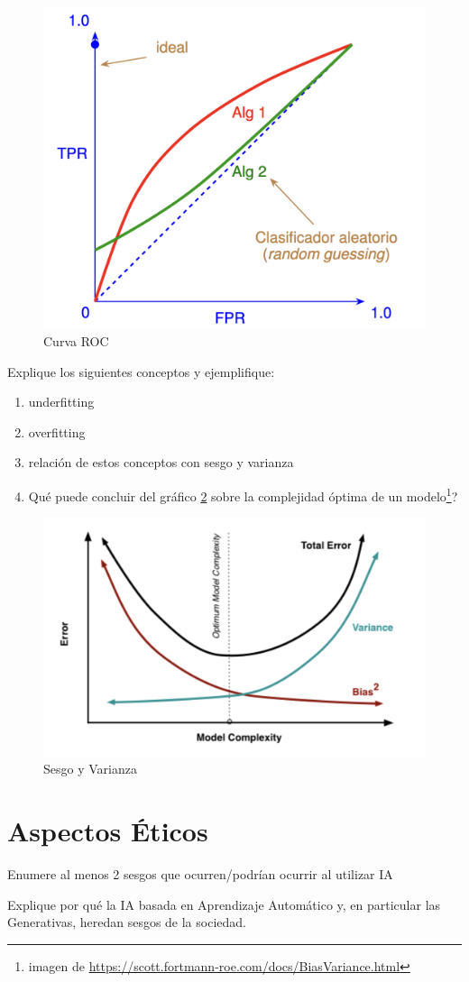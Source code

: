 \documentclass{homework}
\begin{document}
\begin{figure}[h!]
    \centering
    \includegraphics[width=0.5\linewidth]{ROC.png}
    \caption{Curva ROC}\label{fig:roc}
\end{figure}

\question Explique los siguientes conceptos y ejemplifique:

\begin{enumerate}
    \item underfitting
    \item overfitting
    \item relación de estos conceptos con sesgo y varianza
    \item Qué puede concluir del gráfico \ref{fig:bias} sobre la complejidad óptima de un modelo\footnote{imagen de \url{https://scott.fortmann-roe.com/docs/BiasVariance.html}}? 
\end{enumerate}

\begin{figure}[h!]
    \centering
    \includegraphics[width=0.55\linewidth]{bias-variance.png}
    \caption{Sesgo y Varianza}\label{fig:bias}
\end{figure}


\newpage
\section*{Aspectos Éticos}

\question Enumere al menos 2 sesgos que ocurren/podrían ocurrir al utilizar IA

\question Explique por qué la IA basada en Aprendizaje Automático y, en particular las Generativas, heredan sesgos de la sociedad.
\end{document}
